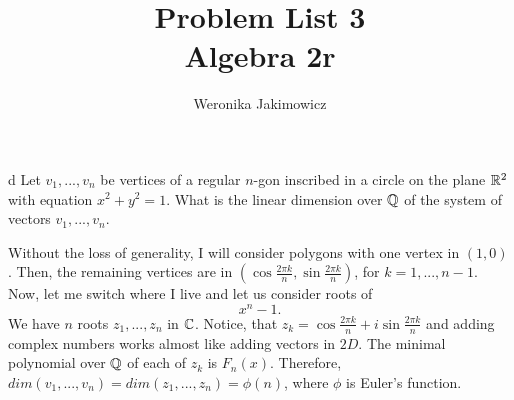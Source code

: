 \documentclass{article}
\title{Problem List 3\smallskip\\{\normalsize Algebra 2r}}
\author{Weronika Jakimowicz}
\date{}
\begin{document}
\maketitle
\thispagestyle{empty}



\begin{problem}[3]{d}
Let $v_1,...,v_n$ be vertices of a regular $n$-gon inscribed in a circle on the plane $\mathbb{R}^2$ with equation $x^2+y^2=1$. What is the linear dimension over $\mathbb{Q}$ of the system of vectors $v_1,...,v_n$.
\end{problem}

Without the loss of generality, I will consider polygons with one vertex in $(1, 0)$. Then, the remaining vertices are in $(\cos\frac{2\pi k}{n},\sin\frac{2\pi k}{n})$, for $k=1,...,n-1$. Now, let me switch where I live and let us consider roots of
$$x^n-1.$$
We have $n$ roots $z_1,...,z_n$ in $\mathbb{C}$. Notice, that $z_k=\cos\frac{2\pi k}{n}+i\sin\frac{2\pi k}{n}$ and adding complex numbers works almost like adding vectors in $2D$. The minimal polynomial over $\mathbb{Q}$ of each of $z_k$ is $F_n(x)$. Therefore, $dim(v_1,...,v_n)=dim(z_1,...,z_n)=\phi(n)$, where $\phi$ is Euler's function.

\end{document}

